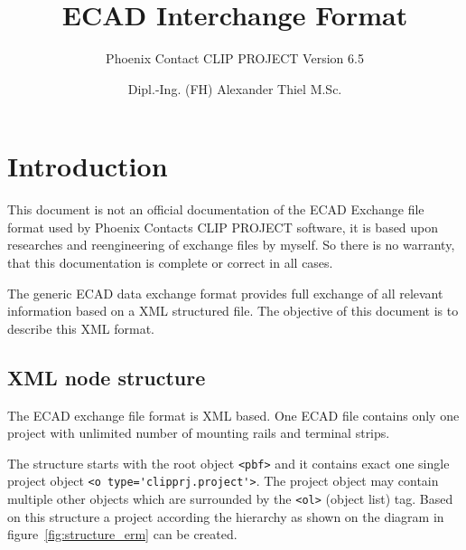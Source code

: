 \documentclass[%
	a4paper,
	oneside,
	listof=numbered,
	parskip=half,
	headsepline=true,
	footsepline=false,
	0.7headlines,
	]{scrbook}
\begin{document}
\title{ECAD Interchange Format}
\subtitle{Phoenix Contact CLIP PROJECT Version 6.5}

\subject{ALX-Development}
\author{Dipl.-Ing. (FH) Alexander Thiel M.Sc.}


\maketitle
\tableofcontents

\chapter{Introduction}

This document is not an official documentation of the ECAD Exchange file format used by Phoenix Contacts
CLIP PROJECT software, it is based upon researches and reengineering of exchange files by myself.
So there is no warranty, that this documentation is complete or correct in all cases.

The generic ECAD data exchange format provides full exchange of all relevant information based on a XML structured file.
The objective of this document is to describe this XML format.

\section{XML node structure}

The ECAD exchange file format is XML based.
One ECAD file contains only one project with unlimited number of mounting rails and terminal strips.

The structure starts with the root object \verb|<pbf>| and it contains exact one single project object \verb|<o type='clipprj.project'>|.
The project object may contain multiple other objects which are surrounded by the \verb|<ol>| (object list) tag.
Based on this structure a project according the hierarchy as shown on the diagram in figure~\ref{fig:structure_erm} can be created.

\end{document}
